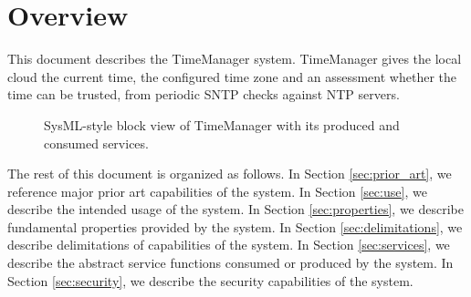 \documentclass[a4paper]{arrowhead}
\begin{document}
\section{Overview}
\label{sec:overview}

This document describes the TimeManager system. TimeManager gives the local cloud the current time, the configured time zone and an assessment whether the time can be trusted, from periodic SNTP checks against NTP servers.

\begin{figure}[ht!]
  \centering
  \caption{SysML-style block view of TimeManager with its produced and consumed services.}
  \label{fig:system}
\end{figure}

The rest of this document is organized as follows.
In Section \ref{sec:prior_art}, we reference major prior art capabilities of the system.
In Section \ref{sec:use}, we describe the intended usage of the system.
In Section \ref{sec:properties}, we describe fundamental properties provided by the system.
In Section \ref{sec:delimitations}, we describe delimitations of capabilities of the system.
In Section \ref{sec:services}, we describe the abstract service functions consumed or produced by the system.
In Section \ref{sec:security}, we describe the security capabilities of the system.
\end{document}
